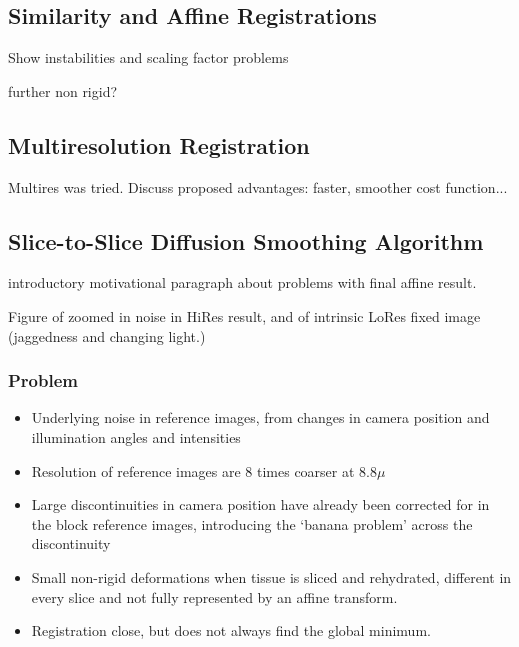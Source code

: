   \subsection{Similarity and Affine Registrations} %
  \label{sub:similarity_and_affine_registrations}
    Show instabilities and scaling factor problems
    
    further non rigid?
  
  \subsection{Multiresolution Registration} %
  \label{sub:multiresolution_registration}
    Multires was tried. Discuss proposed advantages: faster, smoother cost function...
  
  \subsection{Slice-to-Slice Diffusion Smoothing Algorithm} %
  \label{sub:slice_to_slice_diffusion_smoothing_algorithm}
    introductory motivational paragraph about problems with final affine result.
    
    Figure of zoomed in noise in HiRes result, and of intrinsic LoRes fixed image (jaggedness and changing light.)
    
    
    \subsubsection{Problem}
      \begin{itemize}
        \item Underlying noise in reference images, from changes in camera position and illumination angles and intensities
        \item Resolution of reference images are 8 times coarser at 8.8$\mu$ 
        \item Large discontinuities in camera position have already been corrected for in the block reference images, introducing the `banana problem' across the discontinuity
        \item Small non-rigid deformations when tissue is sliced and rehydrated, different in every slice and not fully represented by an affine transform.
        \item Registration close, but does not always find the global minimum.
      \end{itemize}

